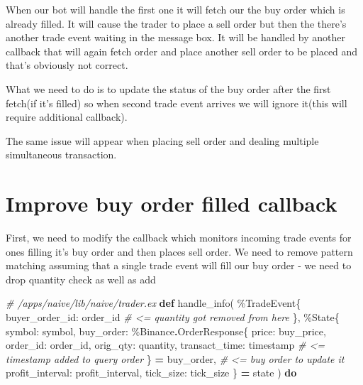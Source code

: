 \documentclass[
]{book}
\newenvironment{Shaded}{\begin{snugshade}}{\end{snugshade}}
\newcommand{\CommentTok}[1]{\textcolor[rgb]{0.56,0.35,0.01}{\textit{#1}}}
\newcommand{\ConstantTok}[1]{\textcolor[rgb]{0.00,0.00,0.00}{#1}}
\newcommand{\KeywordTok}[1]{\textcolor[rgb]{0.13,0.29,0.53}{\textbf{#1}}}
\newcommand{\NormalTok}[1]{#1}
\newcommand{\OperatorTok}[1]{\textcolor[rgb]{0.81,0.36,0.00}{\textbf{#1}}}
\newcommand{\VariableTok}[1]{\textcolor[rgb]{0.00,0.00,0.00}{#1}}
\begin{document}
When our bot will handle the first one it will fetch our the buy order which is already filled. It will cause the trader to place a sell order but then the there's another trade event waiting in the message box. It will be handled by another callback that will again fetch order and place another sell order to be placed and that's obviously not correct.

What we need to do is to update the status of the buy order after the first fetch(if it's filled) so when second trade event arrives we will ignore it(this will require additional callback).

The same issue will appear when placing sell order and dealing multiple simultaneous transaction.

\hypertarget{improve-buy-order-filled-callback}{%
\section{Improve buy order filled callback}\label{improve-buy-order-filled-callback}}

First, we need to modify the callback which monitors incoming trade events for ones filling it's buy order and then places sell order. We need to remove pattern matching assuming that a single trade event will fill our buy order - we need to drop quantity check as well as add

\begin{Shaded}
\begin{Highlighting}[]
  \CommentTok{\# /apps/naive/lib/naive/trader.ex}
  \KeywordTok{def}\NormalTok{ handle\_info(}
\NormalTok{        \%}\ConstantTok{TradeEvent}\NormalTok{\{}
          \VariableTok{buyer\_order\_id:}\NormalTok{ order\_id }\CommentTok{\# \textless{}= quantity got removed from here}
\NormalTok{        \},}
\NormalTok{        \%}\ConstantTok{State}\NormalTok{\{}
          \VariableTok{symbol:}\NormalTok{ symbol,}
          \VariableTok{buy\_order:}
\NormalTok{            \%}\ConstantTok{Binance}\OperatorTok{.}\ConstantTok{OrderResponse}\NormalTok{\{}
              \VariableTok{price:}\NormalTok{ buy\_price,}
              \VariableTok{order\_id:}\NormalTok{ order\_id,}
              \VariableTok{orig\_qty:}\NormalTok{ quantity,}
              \VariableTok{transact\_time:}\NormalTok{ timestamp }\CommentTok{\# \textless{}= timestamp added to query order}
\NormalTok{            \} }\OperatorTok{=}\NormalTok{ buy\_order, }\CommentTok{\# \textless{}= buy order to update it}
          \VariableTok{profit\_interval:}\NormalTok{ profit\_interval,}
          \VariableTok{tick\_size:}\NormalTok{ tick\_size}
\NormalTok{        \} }\OperatorTok{=}\NormalTok{ state}
\NormalTok{      ) }\KeywordTok{do}
\end{Highlighting}
\end{Shaded}
\end{document}

